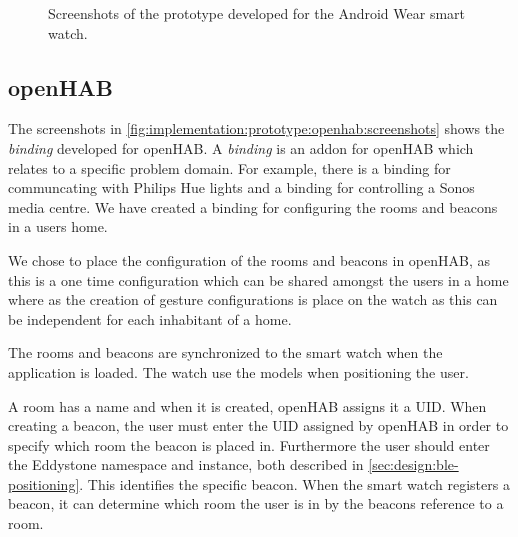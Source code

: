 \begin{figure}[!htb]
{    }
    \caption{Screenshots of the prototype developed for the Android Wear smart watch.}
    \label{fig:implementation:prototype:screenshots}
\end{figure}

\subsection{openHAB}
\label{sec:implementation:prototype:openhab}

The screenshots in \cref{fig:implementation:prototype:openhab:screenshots} shows the \emph{binding} developed for openHAB. A \emph{binding} is an addon for openHAB which relates to a specific problem domain. For example, there is a binding for communcating with Philips Hue lights and a binding for controlling a Sonos media centre. We have created a binding for configuring the rooms and beacons in a users home.

We chose to place the configuration of the rooms and beacons in openHAB, as this is a one time configuration which can be shared amongst the users in a home where as the creation of gesture configurations is place on the watch as this can be independent for each inhabitant of a home.

The rooms and beacons are synchronized to the smart watch when the application is loaded. The watch use the models when positioning the user.

A room has a name and when it is created, openHAB assigns it a UID. When creating a beacon, the user must enter the UID assigned by openHAB in order to specify which room the beacon is placed in. Furthermore the user should enter the Eddystone namespace and instance, both described in \cref{sec:design:ble-positioning}. This identifies the specific beacon. When the smart watch registers a beacon, it can determine which room the user is in by the beacons reference to a room.

